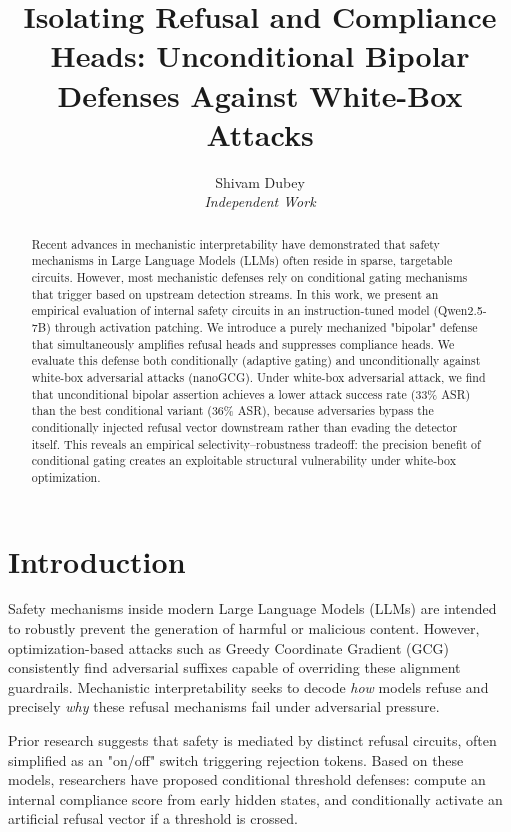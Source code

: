 \documentclass[11pt,a4paper]{article}
\title{Isolating Refusal and Compliance Heads: Unconditional Bipolar Defenses Against White-Box Attacks}
\author{Shivam Dubey \\ \textit{Independent Work}}
\date{}
\begin{document}
\maketitle

\begin{abstract}
Recent advances in mechanistic interpretability have demonstrated that safety mechanisms in Large Language Models (LLMs) often reside in sparse, targetable circuits. However, most mechanistic defenses rely on conditional gating mechanisms that trigger based on upstream detection streams. In this work, we present an empirical evaluation of internal safety circuits in an instruction-tuned model (Qwen2.5-7B) through activation patching. We introduce a purely mechanized "bipolar" defense that simultaneously amplifies refusal heads and suppresses compliance heads. We evaluate this defense both conditionally (adaptive gating) and unconditionally against white-box adversarial attacks (nanoGCG). Under white-box adversarial attack, we find that unconditional bipolar assertion achieves a lower attack success rate (33\% ASR) than the best conditional variant (36\% ASR), because adversaries bypass the conditionally injected refusal vector downstream rather than evading the detector itself. This reveals an empirical selectivity--robustness tradeoff: the precision benefit of conditional gating creates an exploitable structural vulnerability under white-box optimization.
\end{abstract}

\section{Introduction}
Safety mechanisms inside modern Large Language Models (LLMs) are intended to robustly prevent the generation of harmful or malicious content. However, optimization-based attacks such as Greedy Coordinate Gradient (GCG) consistently find adversarial suffixes capable of overriding these alignment guardrails. Mechanistic interpretability seeks to decode \textit{how} models refuse and precisely \textit{why} these refusal mechanisms fail under adversarial pressure.

Prior research suggests that safety is mediated by distinct refusal circuits, often simplified as an "on/off" switch triggering rejection tokens. Based on these models, researchers have proposed conditional threshold defenses: compute an internal compliance score from early hidden states, and conditionally activate an artificial refusal vector if a threshold is crossed.
\end{document}
